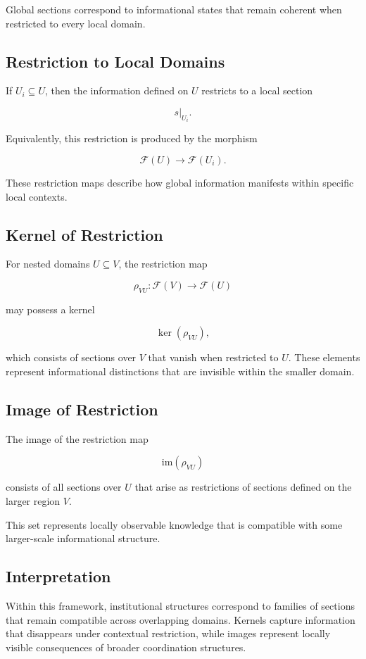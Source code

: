 \documentclass[12pt]{article}
\begin{document}
Global sections correspond to informational states that remain coherent when restricted to every local domain.

\subsection{Restriction to Local Domains}

If $U_i \subseteq U$, then the information defined on $U$ restricts to a local section

\[
s|_{U_i}.
\]

Equivalently, this restriction is produced by the morphism

\[
\mathcal{F}(U) \rightarrow \mathcal{F}(U_i).
\]

These restriction maps describe how global information manifests within specific local contexts.

\subsection{Kernel of Restriction}

For nested domains $U \subseteq V$, the restriction map

\[
\rho_{VU} : \mathcal{F}(V) \rightarrow \mathcal{F}(U)
\]

may possess a kernel

\[
\ker(\rho_{VU}),
\]

which consists of sections over $V$ that vanish when restricted to $U$. These elements represent informational distinctions that are invisible within the smaller domain.

\subsection{Image of Restriction}

The image of the restriction map

\[
\mathrm{im}(\rho_{VU})
\]

consists of all sections over $U$ that arise as restrictions of sections defined on the larger region $V$.

This set represents locally observable knowledge that is compatible with some larger-scale informational structure.

\subsection{Interpretation}

Within this framework, institutional structures correspond to families of sections that remain compatible across overlapping domains. Kernels capture information that disappears under contextual restriction, while images represent locally visible consequences of broader coordination structures.
\end{document}
